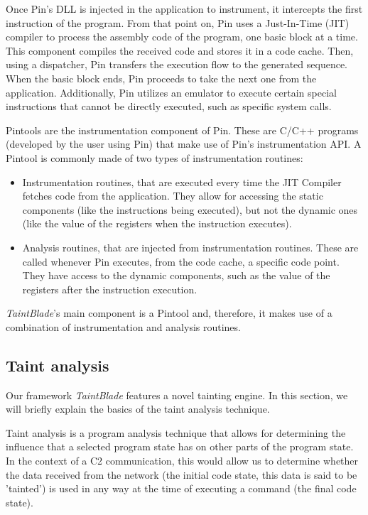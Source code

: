 \documentclass[conference]{IEEEtran}
\begin{document}
Once Pin's DLL is injected in the application to instrument, it intercepts the
first instruction of the program. From that point on, Pin uses a Just-In-Time
(JIT) compiler to process the assembly code of the program, one basic block at
a time. This component compiles the received code and stores it in a code
cache. Then, using a dispatcher, Pin transfers the execution flow to the
generated sequence. When the basic block ends, Pin proceeds to take the next
one from the application. Additionally, Pin utilizes an emulator to execute
certain special instructions that cannot be directly executed, such as specific
system calls.

Pintools are the instrumentation component of Pin. These are C/C++ programs
(developed by the user using Pin) that make use of Pin's instrumentation API. A
Pintool is commonly made of two types of instrumentation routines:
\begin{itemize}
    \item Instrumentation routines, that are executed every time the JIT Compiler fetches
          code from the application. They allow for accessing the static components (like
          the instructions being executed), but not the dynamic ones (like the value of
          the registers when the instruction executes).
    \item Analysis routines, that are injected from instrumentation routines. These are
          called whenever Pin executes, from the code cache, a specific code point. They
          have access to the dynamic components, such as the value of the registers after
          the instruction execution.
\end{itemize}

\textit{TaintBlade}'s main component is a Pintool and, therefore, it makes use of a combination of
instrumentation and analysis routines.

\subsection {Taint analysis}\label{subsec:taint_analysis}
Our framework \textit{TaintBlade} features a novel tainting engine. In this
section, we will briefly explain the basics of the taint analysis technique.

Taint analysis is a program analysis technique that allows for determining the
influence that a selected program state has on other parts of the program
state\cite{book_practical_binary_analysis}. In the context of a C2
communication, this would allow us to determine whether the data received from
the network (the initial code state, this data is said to be 'tainted') is used
in any way at the time of executing a command (the final code state).
\end{document}
